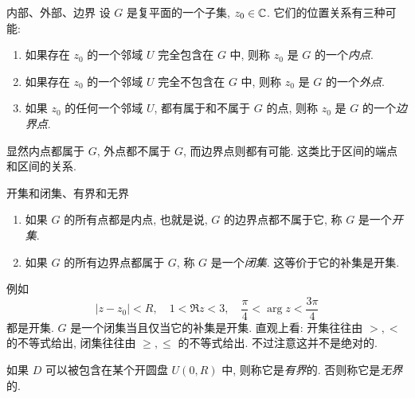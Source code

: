 \begin{frame}{内部、外部、边界}
	\onslide<+->
	设 $G$ 是复平面的一个子集, $z_0\in{\mathbb{C}}$.
	\onslide<+->
	它们的位置关系有三种可能:
	\begin{enumerate}
		\item 如果存在 $z_0$ 的一个邻域 $U$ 完全包含在 $G$ 中, 则称 $z_0$ 是 $G$ 的一个\emph{内点}.
		\item 如果存在 $z_0$ 的一个邻域 $U$ 完全不包含在 $G$ 中, 则称 $z_0$ 是 $G$ 的一个\emph{外点}.
		\item 如果 $z_0$ 的任何一个邻域 $U$, 都有属于和不属于 $G$ 的点, 则称 $z_0$ 是 $G$ 的一个\emph{边界点}.
	\end{enumerate}
	\onslide<+->
	显然内点都属于 $G$, 外点都不属于 $G$, 而边界点则都有可能.
	\onslide<+->
	这类比于区间的端点和区间的关系.

	\begin{center}
	\end{center}
\end{frame}


\begin{frame}{开集和闭集、有界和无界}
	\onslide<+->
	\begin{definition}
		\begin{enumerate}
			\item 如果 $G$ 的所有点都是内点, 也就是说, $G$ 的边界点都不属于它, 称 $G$ 是一个\emph{开集}.
			\item 如果 $G$ 的所有边界点都属于 $G$, 称 $G$ 是一个\emph{闭集}. 这等价于它的补集是开集.
		\end{enumerate}
	\end{definition}
	\onslide<+->
	例如
	\[|z-z_0|<R,\quad 1<\Re z<3,\quad\frac\pi4<\arg z<\dfrac{3\pi}4\]
	都是开集.
	\onslide<+->
	$G$ 是一个闭集当且仅当它的补集是开集.
	\onslide<+->
	直观上看: 开集往往由 $>,<$ 的不等式给出, 闭集往往由 $\ge,\le$ 的不等式给出.
	\onslide<+->
	不过注意这并不是绝对的.

	\onslide<+->
	如果 $D$ 可以被包含在某个开圆盘 $U(0,R)$ 中, 则称它是\emph{有界}的.
	\onslide<+->
	否则称它是\emph{无界}的.
\end{frame}


